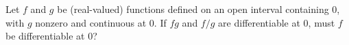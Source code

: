 Let $f$ and $g$ be (real-valued) functions defined on an open interval containing $0$, with $g$ nonzero and continuous at $0$. If $fg$ and $f/g$ are differentiable at $0$, must $f$ be differentiable at $0$?